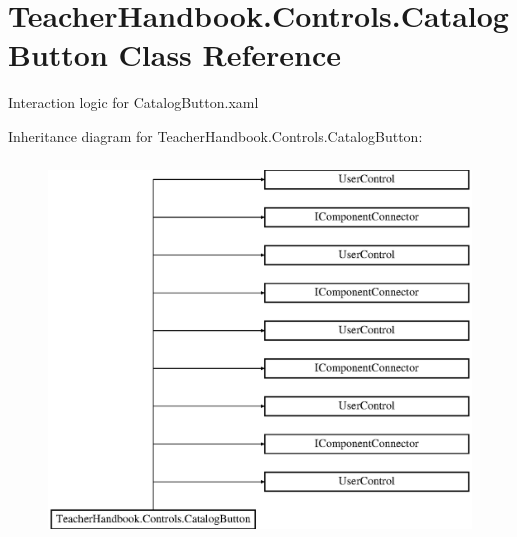 \hypertarget{class_teacher_handbook_1_1_controls_1_1_catalog_button}{}\section{Teacher\+Handbook.\+Controls.\+Catalog\+Button Class Reference}
\label{class_teacher_handbook_1_1_controls_1_1_catalog_button}


Interaction logic for Catalog\+Button.\+xaml  


Inheritance diagram for Teacher\+Handbook.\+Controls.\+Catalog\+Button\+:\begin{figure}[H]
\begin{center}
\leavevmode
\includegraphics[height=10.000000cm]{df/d61/class_teacher_handbook_1_1_controls_1_1_catalog_button}
\end{center}
\end{figure}
